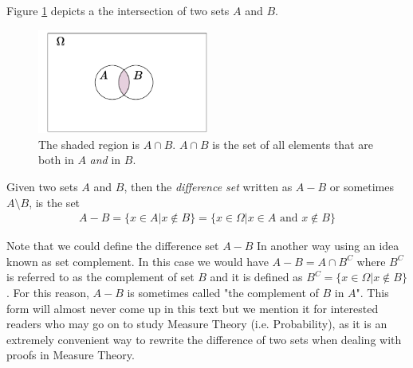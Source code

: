 \noindent Figure \ref{fig:set_intersection_example} depicts a the intersection of two sets $A$ and $B$.
\begin{figure}[h!]
    \centering
    \includegraphics[width=0.5\textwidth]{Figures/Set_INTERSECTION.pdf}
    \caption{The shaded region is $A\cap B$. $A\cap B$ is the set of all elements that are both in $A$ \textit{and} in $B$.}
    \label{fig:set_intersection_example}
\end{figure}

\begin{definition}
Given two sets $A$ and $B$, then the \textit{difference set} written as $A - B$ or sometimes $A\setminus B$, is the set
\begin{align}
    A-B=\{x\in A| x\not\in B\}=\{x\in \Omega |x\in A \text{ and } x\not\in B \} \nonumber
\end{align}
\end{definition}
Note that we could define the difference set $A- B$ %
In another way using an idea known as set complement. In this case we would have $A- B=A\cap B^C$ where $B^C$ is referred to as the complement of set $B$ and it is defined as $B^C=\{x\in \Omega| x\not \in B\}$. For this reason, $A-B$ is sometimes called "the complement of $B$ in $A$". This form will almost never come up in this text but we mention it for interested readers who may go on to study Measure Theory (i.e. Probability), as it is an extremely convenient way to rewrite the difference of two sets when dealing with proofs in Measure Theory. 

